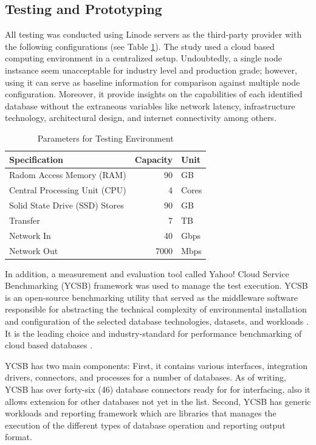 \documentclass[5p]{elsarticle}
\begin{document}
\begin{enumerate}
\end{enumerate}

\subsection{Testing and Prototyping}
All testing was conducted using Linode servers as the third-party provider with the following configurations (see Table \ref{table.cloud.environment}). 
The study used a cloud based computing environment in a centralized setup. 
Undoubtedly, a single node instsance seem unacceptable for industry level and production grade; 
however, using it can serve as baseline information for comparison against multiple node configuration. 
Moreover, it provide insights on the capabilities of each identified database without the extraneous variables like network latency, infrastructure technology, architectural design, and internet connectivity among others. 
 

\begin{table}[ht]
    \centering
    \caption{Parameters for Testing Environment}
     \label{table.cloud.environment}
        \begin{tabular}{lrl}
        \toprule
        Specification &  Capacity & Unit \\
        \hline
        Radom Access Memory (RAM)  & 90 &GB \\
        Central Processing Unit (CPU)  & 4 &Cores \\
        Solid State Drive (SSD) Stores  & 90 &GB \\
        Transfer &  7 &TB \\
        Network In &  40 &Gbps \\
        Network Out &  7000 &Mbps \\
        \hline
    \end{tabular}
\end{table}

In addition, a measurement and evaluation tool called Yahoo! Cloud Service Benchmarking (YCSB) framework was used to manage the test execution.
YCSB is an open-source benchmarking utility that served as the middleware software responsible for abstracting the technical complexity of environmental installation and configuration of the selected database technologies, datasets, and workloads \cite{B.F.Cooper2010143}.
It is the leading choice and industry-standard for performance benchmarking of cloud based databases \cite{Patil11ycsb++:benchmarking}.

YCSB has two main components: First, it contains various interfaces, integration drivers, connectors, and processes for a number of databases. 
As of writing, YCSB has over forty-six (46) database connectors ready for for interfacing, also it allows extension for other databases not yet in the list. 
Second, YCSB has generic workloads and reporting framework which are libraries that manages the execution of the different types of database operation and reporting output format.
						
\end{document}

